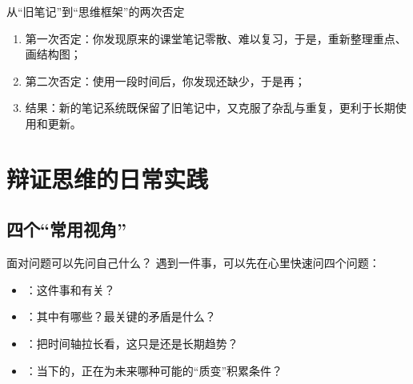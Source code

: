 \documentclass[a4paper,11pt]{ctexart}
\begin{document}
\begin{center}
\end{center}

\begin{examplebox}{从“旧笔记”到“思维框架”的两次否定}
\begin{enumerate}
  \item 第一次否定：你发现原来的课堂笔记零散、难以复习，于是，重新整理重点、画结构图；
  \item 第二次否定：使用一段时间后，你发现还缺少，于是再；
  \item 结果：新的笔记系统既保留了旧笔记中，又克服了杂乱与重复，更利于长期使用和更新。
\end{enumerate}
\end{examplebox}

\section{辩证思维的日常实践}

\subsection{四个“常用视角”}

\begin{summarybox}{面对问题可以先问自己什么？}
遇到一件事，可以先在心里快速问四个问题：
\begin{itemize}
  \item {}：这件事和有关？
  \item {}：其中有哪些？最关键的矛盾是什么？
  \item {}：把时间轴拉长看，这只是还是长期趋势？
  \item {}：当下的，正在为未来哪种可能的“质变”积累条件？
\end{itemize}
\end{summarybox}
\end{document}
